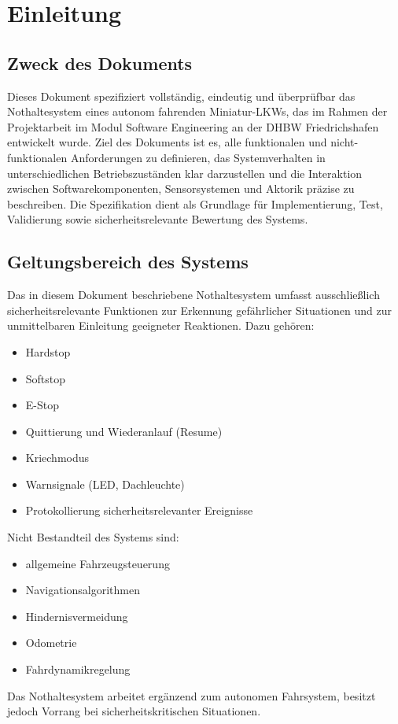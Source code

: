 \section{Einleitung}
\subsection{Zweck des Dokuments}
Dieses Dokument spezifiziert vollständig, eindeutig und überprüfbar das Nothaltesystem eines autonom fahrenden Miniatur-LKWs,
 das im Rahmen der Projektarbeit im Modul Software Engineering an der DHBW Friedrichshafen entwickelt wurde.
Ziel des Dokuments ist es, alle funktionalen und nicht-funktionalen Anforderungen zu definieren, 
das Systemverhalten in unterschiedlichen Betriebszuständen klar darzustellen und die Interaktion zwischen Softwarekomponenten, 
Sensorsystemen und Aktorik präzise zu beschreiben.
Die Spezifikation dient als Grundlage für Implementierung, Test, Validierung sowie sicherheitsrelevante Bewertung des Systems.
\subsection{Geltungsbereich des Systems}
Das in diesem Dokument beschriebene Nothaltesystem umfasst ausschließlich sicherheitsrelevante Funktionen zur Erkennung gefährlicher 
Situationen und zur unmittelbaren Einleitung geeigneter Reaktionen.
Dazu gehören:
\begin{itemize}
	\item \ac{Hardstop}
	\item \ac{Softstop}
	\item \ac{E-Stop}
	\item Quittierung und Wiederanlauf (\ac{Resume})
	\item \ac{Kriechmodus}
	\item Warnsignale (\ac{LED}, Dachleuchte)
	\item Protokollierung sicherheitsrelevanter Ereignisse
\end{itemize}
Nicht Bestandteil des Systems sind:
\begin{itemize}
	\item allgemeine Fahrzeugsteuerung
	\item Navigationsalgorithmen
	\item Hindernisvermeidung
	\item Odometrie
	\item Fahrdynamikregelung
\end{itemize}
Das Nothaltesystem arbeitet ergänzend zum autonomen Fahrsystem, besitzt jedoch Vorrang bei sicherheitskritischen Situationen.




